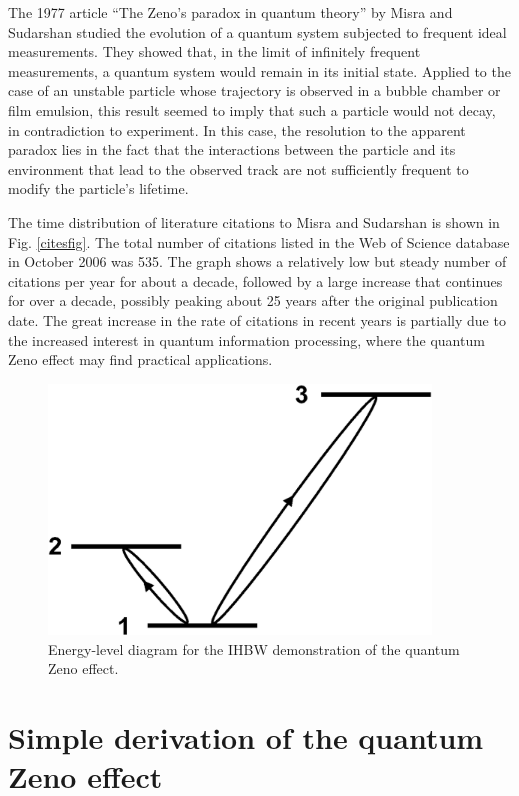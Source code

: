 \documentclass[12pt]{article}
\begin{document}
The 1977 article ``The Zeno's paradox in quantum theory'' by Misra
and Sudarshan \cite{misra77} studied the evolution of a quantum
system subjected to frequent ideal measurements. They showed that,
in the limit of infinitely frequent measurements, a quantum system
would remain in its initial state.  Applied to the case of an
unstable particle whose trajectory is observed in a bubble chamber
or film emulsion, this result seemed to imply that such a particle
would not decay, in contradiction to experiment. In this case, the
resolution to the apparent paradox lies in the fact that the
interactions between the particle and its environment that lead to
the observed track are not sufficiently frequent to modify the
particle's lifetime.


The time distribution of literature citations to Misra and Sudarshan
\cite{misra77} is shown in Fig. \ref{citesfig}.  The total number of
citations listed in the Web of Science database in October 2006 was
535.  The graph shows a relatively low but steady number of
citations per year for about a decade, followed by a large increase
that continues for over a decade, possibly peaking about 25 years
after the original publication date.  The great increase in the rate
of citations in recent years is partially due to the increased
interest in quantum information processing, where the quantum Zeno
effect may find practical applications.

\begin{figure}[hbt]
\begin{center}
\includegraphics[width=4in]{3level2.eps}
\end{center}
\caption{\label{3levelfig}Energy-level diagram for the IHBW
demonstration of the quantum Zeno effect.}
\end{figure}



\section{Simple derivation of the quantum Zeno effect}
\end{document}
